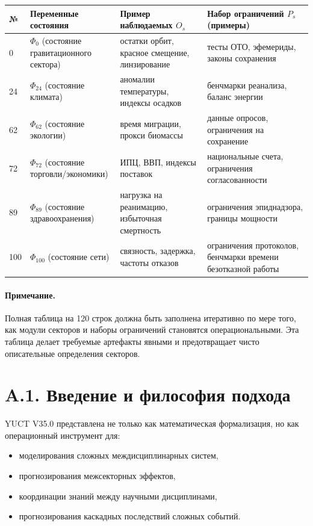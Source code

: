 \documentclass[11pt,a4paper]{article}
\begin{document}
	\begin{longtable}{|p{0.8cm}|p{4.2cm}|p{4.5cm}|p{4.7cm}|}
		\hline
		\textbf{№} & \textbf{Переменные состояния} & \textbf{Пример наблюдаемых $O_s$} & \textbf{Набор ограничений $P_s$ (примеры)} \\
		\hline
		\endhead
		0 & $\Phi_0$ (состояние гравитационного сектора) & остатки орбит, красное смещение, линзирование & тесты ОТО, эфемериды, законы сохранения \\
		24 & $\Phi_{24}$ (состояние климата) & аномалии температуры, индексы осадков & бенчмарки реанализа, баланс энергии \\
		62 & $\Phi_{62}$ (состояние экологии) & время миграции, прокси биомассы & данные опросов, ограничения на сохранение \\
		72 & $\Phi_{72}$ (состояние торговли/экономики) & ИПЦ, ВВП, индексы поставок & национальные счета, ограничения согласованности \\
		89 & $\Phi_{89}$ (состояние здравоохранения) & нагрузка на реанимацию, избыточная смертность & ограничения эпиднадзора, границы мощности \\
		100 & $\Phi_{100}$ (состояние сети) & связность, задержка, частоты отказов & ограничения протоколов, бенчмарки времени безотказной работы \\
	\end{longtable}
	
	\paragraph{Примечание.}
	Полная таблица на 120 строк должна быть заполнена итеративно по мере того, как модули секторов и наборы ограничений становятся операциональными. Эта таблица делает требуемые артефакты явными и предотвращает чисто описательные определения секторов.
	
	\section*{A.1. Введение и философия подхода}
	
	YUCT V35.0 представлена не только как математическая формализация, но как операционный инструмент для:
	\begin{itemize}[leftmargin=*]
		\item моделирования сложных междисциплинарных систем,
		\item прогнозирования межсекторных эффектов,
		\item координации знаний между научными дисциплинами,
		\item прогнозирования каскадных последствий сложных событий.
	\end{itemize}
\end{document}
